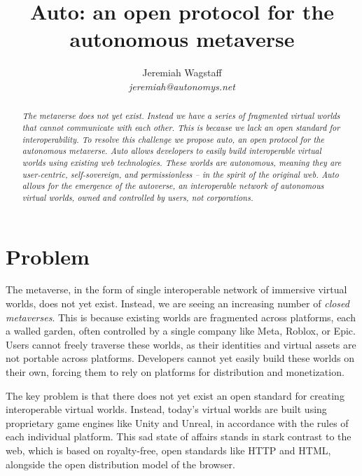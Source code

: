 \documentclass[twocolumn, 10pt]{article}
\begin{document}

\title{%
 \textbf{Auto: an open protocol for the autonomous metaverse }
}
\author{Jeremiah Wagstaff \\
\textit{jeremiah@autonomys.net}
}

\date{}

\maketitle

\begin{abstract}
\textit{The metaverse does not yet exist. Instead we have a series of fragmented virtual worlds that cannot communicate with each other. This is because we lack an open standard for interoperability. To resolve this challenge we propose auto, an open protocol for the autonomous metaverse. Auto allows developers to easily build interoperable virtual worlds using existing web technologies. These worlds are autonomous, meaning they are user-centric, self-sovereign, and permissionless -- in the spirit of the original web. Auto allows for the emergence of the autoverse, an interoperable network of autonomous virtual worlds, owned and controlled by users, not corporations.}
\end{abstract}

\section{Problem}
The metaverse, in the form of single interoperable network of immersive virtual worlds, does not yet exist. Instead, we are seeing an increasing number of \textit{closed metaverses}. This is because existing worlds are fragmented across platforms, each a walled garden, often controlled by a single company like Meta, Roblox, or Epic. Users cannot freely traverse these worlds, as their identities and virtual assets are not portable across platforms. Developers cannot yet easily build these worlds on their own, forcing them to rely on platforms for distribution and monetization.

The key problem is that there does not yet exist an open standard for creating interoperable virtual worlds. Instead, today’s virtual worlds are built using proprietary game engines like Unity and Unreal, in accordance with the rules of each individual platform. This sad state of affairs stands in stark contrast to the web, which is based on royalty-free, open standards like HTTP and HTML, alongside the open distribution model of the browser.
\end{document}

